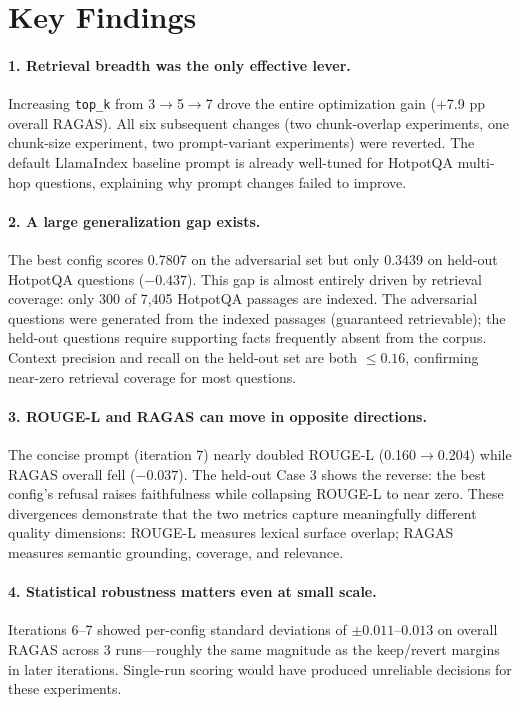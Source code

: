 \documentclass[11pt,a4paper]{article}
\begin{document}
\section{Key Findings}
\label{sec:findings}

\paragraph{1. Retrieval breadth was the only effective lever.}
Increasing \texttt{top\_k} from 3$\to$5$\to$7 drove the entire optimization
gain (+7.9 pp overall RAGAS). All six subsequent changes (two chunk-overlap
experiments, one chunk-size experiment, two prompt-variant experiments) were
reverted. The default LlamaIndex baseline prompt is already well-tuned for
HotpotQA multi-hop questions, explaining why prompt changes failed to improve.

\paragraph{2. A large generalization gap exists.}
The best config scores 0.7807 on the adversarial set but only 0.3439 on
held-out HotpotQA questions ($-0.437$). This gap is almost entirely driven by
retrieval coverage: only 300 of 7,405 HotpotQA passages are indexed. The
adversarial questions were generated from the indexed passages (guaranteed
retrievable); the held-out questions require supporting facts frequently absent
from the corpus. Context precision and recall on the held-out set are both
$\leq 0.16$, confirming near-zero retrieval coverage for most questions.

\paragraph{3. ROUGE-L and RAGAS can move in opposite directions.}
The concise prompt (iteration 7) nearly doubled ROUGE-L (0.160$\to$0.204)
while RAGAS overall fell ($-0.037$). The held-out Case 3 shows the reverse:
the best config's refusal raises faithfulness while collapsing ROUGE-L to near
zero. These divergences demonstrate that the two metrics capture meaningfully
different quality dimensions: ROUGE-L measures lexical surface overlap; RAGAS
measures semantic grounding, coverage, and relevance.

\paragraph{4. Statistical robustness matters even at small scale.}
Iterations 6--7 showed per-config standard deviations of $\pm0.011$--$0.013$
on overall RAGAS across 3 runs---roughly the same magnitude as the keep/revert
margins in later iterations. Single-run scoring would have produced unreliable
decisions for these experiments.
\end{document}
